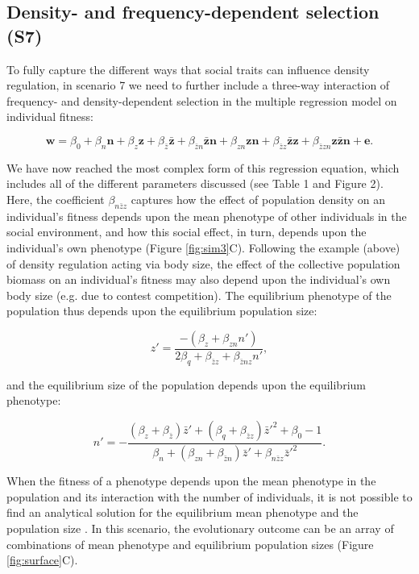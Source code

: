 \documentclass{article}
\begin{document}
\subsection{Density- and frequency-dependent selection (S7)}

To fully capture the different ways that social traits can influence density regulation, in scenario 7 we need to further include a three-way interaction of frequency- and density-dependent selection in the multiple regression model on individual fitness:

\begin{equation} 
\mathbf{w}=\beta_{0} +\beta_{n} \mathbf{n} + \beta_{z} \mathbf{z}+ \beta_{\bar{z}} \mathbf{\bar{z}}  +   \beta_{\bar{z}n} \mathbf{\bar{z}n} +   \beta_{zn} \mathbf{zn} + \beta_{\bar{z}z} \mathbf{\bar{z}z}   +   \beta_{\bar{z}zn} \mathbf{z\bar{z}n} + \mathbf{e}.
\end{equation}

\noindent We have now reached the most complex form of this regression equation, which includes all of the different parameters discussed (see Table 1 and Figure 2). Here, the coefficient $\beta_{n\bar{z}z}$ captures how the effect of population density on an individual's fitness depends upon the mean phenotype of other individuals in the social environment, and how this social effect, in turn, depends upon the individual's own phenotype (Figure \ref{fig:sim3}C). Following the example (above) of density regulation acting via body size, the effect of the collective population biomass on an individual's fitness may also depend upon the individual's own body size (e.g. due to contest competition). The equilibrium phenotype of the population thus depends upon the equilibrium population size: 

\begin{equation} 
z'=\frac{-(\beta_{z}+\beta_{zn}n')}{2\beta_{q} + \beta_{\bar{z}z} + \beta_{\bar{z}nz}n'},
\end{equation} 

\noindent and the equilibrium size of the population depends upon the equilibrium phenotype:

\begin{equation}  \label{eq: full}
	n' = -\frac{(\beta_{z}  +  \beta_{\bar{z}})\bar{z}' + (\beta_{q} + \beta_{\bar{z}z})\bar{z}'^2 +\beta_{0} -1}{\beta_{n} + (\beta_{zn} + \beta_{\bar{z}n}) \bar{z}' +  \beta_{n\bar{z}z}\bar{z}'^2}.
\end{equation}

When the fitness of a phenotype depends upon the mean phenotype in the population and its interaction with the number of individuals, it is not possible to find an analytical solution for the equilibrium mean phenotype and the population size \citep{Engen2020}. In this scenario, the evolutionary outcome can be an array of combinations of mean phenotype and equilibrium population sizes (Figure \ref{fig:surface}C).
\end{document}

